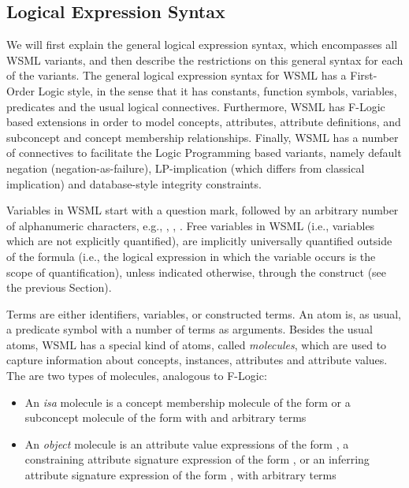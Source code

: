 \subsection{Logical Expression Syntax}
\label{sec:log-expr-syntax}

We will first explain the general logical expression syntax, which
encompasses all WSML variants, and then describe the restrictions on
this general syntax for each of the variants. The general logical
expression syntax for WSML has a First-Order Logic style, in the
sense that it has constants, function symbols, variables, predicates
and the usual logical connectives. Furthermore, WSML has F-Logic
\cite{Kifer+LausenETAL-LogiFounObjeFram:95} based extensions in
order to model concepts, attributes, attribute definitions, and
subconcept and concept membership relationships. Finally, WSML has a
number of connectives to facilitate the Logic Programming based
variants, namely default negation (negation-as-failure),
LP-implication (which differs from classical implication) and
database-style integrity constraints.

Variables in WSML start with a question mark, followed by an
arbitrary number of alphanumeric characters, e.g., ,
, . Free variables in WSML (i.e., variables
which are not explicitly quantified), are implicitly universally
quantified outside of the formula (i.e., the logical expression in
which the variable occurs is the scope of quantification), unless
indicated otherwise, through the  construct
(see the previous Section).

Terms are either identifiers, variables, or constructed terms. An
atom is, as usual, a predicate symbol with a number of terms as
arguments. Besides the usual atoms, WSML has a special kind of
atoms, called \emph{molecules}, which are used to capture
information about concepts, instances, attributes and attribute
values. The are two types of molecules, analogous to F-Logic:

\begin{itemize}
\item An \emph{isa} molecule is a concept membership molecule of
  the form  or a subconcept
  molecule of the form 
  with  and  arbitrary terms

\item An \emph{object} molecule is an attribute value expressions
  of the form , a
  constraining attribute signature expression of the form
  , or an inferring attribute signature expression of the form
  , with
   arbitrary terms
\end{itemize}

